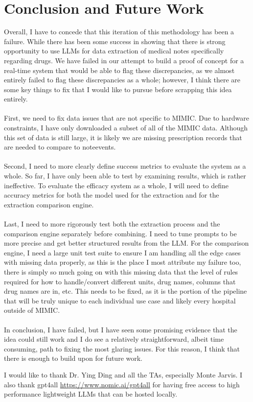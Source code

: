 \documentclass[sigconf,nonacm]{acmart} %
\begin{document}
\section{Conclusion and Future Work}
Overall, I have to concede that this iteration of this methodology has been a failure. While there has been some success in showing that there is strong opportunity to use LLMs for data extraction of medical notes specifically regarding drugs. We have failed in our attempt to build a proof of concept for a real-time system that would be able to flag these discrepancies, as we almost entirely failed to flag these discrepancies as a whole; however, I think there are some key things to fix that I would like to pursue before scrapping this idea entirely.
\\\\First, we need to fix data issues that are not specific to MIMIC. Due to hardware constraints, I have only downloaded a subset of all of the MIMIC data. Although this set of data is still large, it is likely we are missing prescription records that are needed to compare to noteevents.
\\\\Second, I need to more clearly define success metrics to evaluate the system as a whole. So far, I have only been able to test by examining results, which is rather ineffective. To evaluate the efficacy system as a whole, I will need to define accuracy metrics for both the model used for the extraction and for the extraction comparison engine.
\\\\Last, I need to more rigorously test both the extraction process and the comparison engine separately before combining. I need to tune prompts to be more precise and get better structured results from the LLM. For the comparison engine, I need a large unit test suite to ensure I am handling all the edge cases with missing data properly, as this is the place I most attribute my failure too, there is simply so much going on with this missing data that the level of rules required for how to handle/convert different units, drug names, columns that drug names are in, etc. This needs to be fixed, as it is the portion of the pipeline that will be truly unique to each individual use case and likely every hospital outside of MIMIC.
\\\\In conclusion, I have failed, but I have seen some promising evidence that the idea could still work and I do see a relatively straightforward, albeit time consuming, path to fixing the most glaring issues. For this reason, I think that there is enough to build upon for future work.

\begin{acks}
I would like to thank Dr. Ying Ding and all the TAs, especially Monte Jarvis. I also thank gpt4all \url{https://www.nomic.ai/gpt4all} for having free access to high performance lightweight LLMs that can be hosted locally.
\end{acks}



\nocite{*}
\end{document}
